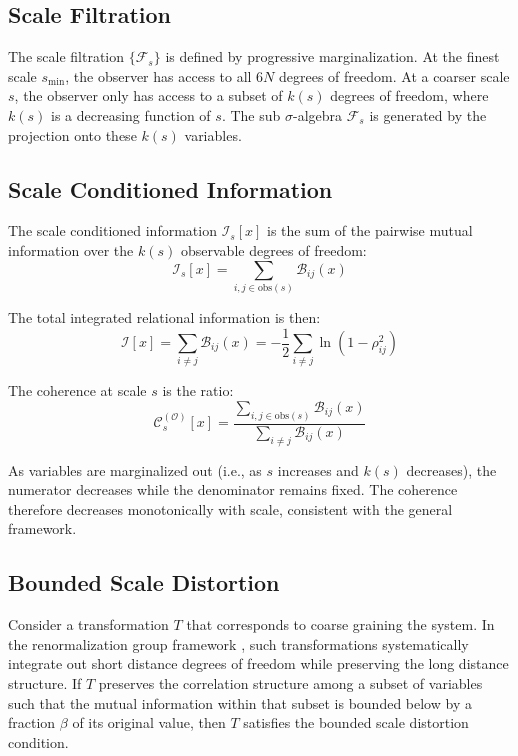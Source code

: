 \documentclass[12pt]{article}
\theoremstyle{definition}
\begin{document}
\subsection{Scale Filtration}
The scale filtration $\{\mathcal{F}_s\}$ is defined by progressive marginalization. At the finest scale $s_{\min}$, the observer has access to all $6N$ degrees of freedom. At a coarser scale $s$, the observer only has access to a subset of $k(s)$ degrees of freedom, where $k(s)$ is a decreasing function of $s$. The sub $\sigma$-algebra $\mathcal{F}_s$ is generated by the projection onto these $k(s)$ variables.

\subsection{Scale Conditioned Information}
The scale conditioned information $\mathcal{I}_s[x]$ is the sum of the pairwise mutual information over the $k(s)$ observable degrees of freedom:
\begin{equation}
\mathcal{I}_s[x] = \sum_{i,j \in \text{obs}(s)} \mathcal{B}_{ij}(x)
\end{equation}

The total integrated relational information is then:
\begin{equation}
\mathcal{I}[x] = \sum_{i \neq j} \mathcal{B}_{ij}(x) = -\frac{1}{2} \sum_{i \neq j} \ln(1 - \rho_{ij}^2)
\end{equation}

The coherence at scale $s$ is the ratio:
\begin{equation}
\mathcal{C}_s^{(\mathcal{O})}[x] = \frac{\sum_{i,j \in \text{obs}(s)} \mathcal{B}_{ij}(x)}{\sum_{i \neq j} \mathcal{B}_{ij}(x)}
\end{equation}

As variables are marginalized out (i.e., as $s$ increases and $k(s)$ decreases), the numerator decreases while the denominator remains fixed. The coherence therefore decreases monotonically with scale, consistent with the general framework.

\subsection{Bounded Scale Distortion}
Consider a transformation $T$ that corresponds to coarse graining the system. In the renormalization group framework \cite{wilson1975renormalization}, such transformations systematically integrate out short distance degrees of freedom while preserving the long distance structure. If $T$ preserves the correlation structure among a subset of variables such that the mutual information within that subset is bounded below by a fraction $\beta$ of its original value, then $T$ satisfies the bounded scale distortion condition.
\end{document}
